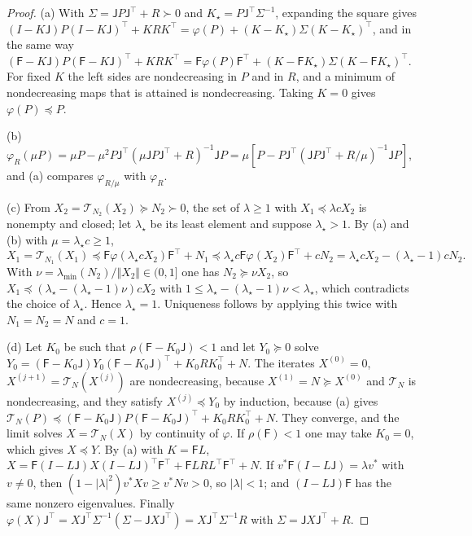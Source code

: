 \begin{proof}
(a) With $\Sigma=\mathsf JP\mathsf J^\top+R\succ0$ and $K_\star=P\mathsf J^\top\Sigma^{-1}$, expanding the square gives $(I-K\mathsf J)P(I-K\mathsf J)^\top+KRK^\top=\varphi(P)+(K-K_\star)\Sigma(K-K_\star)^\top$, and in the same way $(\mathsf F-K\mathsf J)P(\mathsf F-K\mathsf J)^\top+KRK^\top=\mathsf F\varphi(P)\mathsf F^\top+(K-\mathsf FK_\star)\Sigma(K-\mathsf FK_\star)^\top$. For fixed $K$ the left sides are nondecreasing in $P$ and in $R$, and a minimum of nondecreasing maps that is attained is nondecreasing. Taking $K=0$ gives $\varphi(P)\preceq P$.

(b) $\varphi_R(\mu P)=\mu P-\mu^2P\mathsf J^\top(\mu\mathsf JP\mathsf J^\top+R)^{-1}\mathsf JP=\mu[P-P\mathsf J^\top(\mathsf JP\mathsf J^\top+R/\mu)^{-1}\mathsf JP]$, and (a) compares $\varphi_{R/\mu}$ with $\varphi_R$.

(c) From $X_2=\mathcal T_{N_2}(X_2)\succeq N_2\succ0$, the set of $\lambda\ge1$ with $X_1\preceq\lambda cX_2$ is nonempty and closed; let $\lambda_\star$ be its least element and suppose $\lambda_\star>1$. By (a) and (b) with $\mu=\lambda_\star c\ge1$,
\begin{equation*}
X_1=\mathcal T_{N_1}(X_1)\preceq\mathsf F\varphi(\lambda_\star cX_2)\mathsf F^\top+N_1\preceq\lambda_\star c\mathsf F\varphi(X_2)\mathsf F^\top+cN_2=\lambda_\star cX_2-(\lambda_\star-1)cN_2 .
\end{equation*}
With $\nu=\lambda_{\min}(N_2)/\Vert X_2\Vert\in(0,1]$ one has $N_2\succeq\nu X_2$, so $X_1\preceq(\lambda_\star-(\lambda_\star-1)\nu)cX_2$ with $1\le\lambda_\star-(\lambda_\star-1)\nu<\lambda_\star$, which contradicts the choice of $\lambda_\star$. Hence $\lambda_\star=1$. Uniqueness follows by applying this twice with $N_1=N_2=N$ and $c=1$.

(d) Let $K_0$ be such that $\rho(\mathsf F-K_0\mathsf J)<1$ and let $Y_0\succeq0$ solve $Y_0=(\mathsf F-K_0\mathsf J)Y_0(\mathsf F-K_0\mathsf J)^\top+K_0RK_0^\top+N$. The iterates $X^{(0)}=0$, $X^{(j+1)}=\mathcal T_N(X^{(j)})$ are nondecreasing, because $X^{(1)}=N\succeq X^{(0)}$ and $\mathcal T_N$ is nondecreasing, and they satisfy $X^{(j)}\preceq Y_0$ by induction, because (a) gives $\mathcal T_N(P)\preceq(\mathsf F-K_0\mathsf J)P(\mathsf F-K_0\mathsf J)^\top+K_0RK_0^\top+N$. They converge, and the limit solves $X=\mathcal T_N(X)$ by continuity of $\varphi$. If $\rho(\mathsf F)<1$ one may take $K_0=0$, which gives $X\preceq Y$. By (a) with $K=\mathsf FL$, $X=\mathsf F(I-L\mathsf J)X(I-L\mathsf J)^\top\mathsf F^\top+\mathsf FLRL^\top\mathsf F^\top+N$. If $v^*\mathsf F(I-L\mathsf J)=\lambda v^*$ with $v\ne0$, then $(1-\lvert\lambda\rvert^2)v^*Xv\ge v^*Nv>0$, so $\lvert\lambda\rvert<1$; and $(I-L\mathsf J)\mathsf F$ has the same nonzero eigenvalues. Finally $\varphi(X)\mathsf J^\top=X\mathsf J^\top\Sigma^{-1}(\Sigma-\mathsf JX\mathsf J^\top)=X\mathsf J^\top\Sigma^{-1}R$ with $\Sigma=\mathsf JX\mathsf J^\top+R$.


\end{proof}
